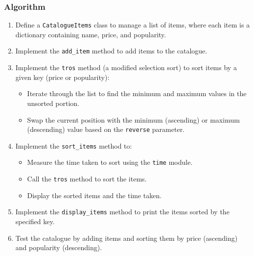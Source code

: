 \documentclass[a4paper,12pt]{article}
\begin{document}
\subsubsection*{Algorithm}
\begin{enumerate}
    \item Define a \texttt{CatalogueItems} class to manage a list of items, where each item is a dictionary containing name, price, and popularity.
    \item Implement the \texttt{add\_item} method to add items to the catalogue.
    \item Implement the \texttt{tros} method (a modified selection sort) to sort items by a given key (price or popularity):
    \begin{itemize}
        \item Iterate through the list to find the minimum and maximum values in the unsorted portion.
        \item Swap the current position with the minimum (ascending) or maximum (descending) value based on the \texttt{reverse} parameter.
    \end{itemize}
    \item Implement the \texttt{sort\_items} method to:
    \begin{itemize}
        \item Measure the time taken to sort using the \texttt{time} module.
        \item Call the \texttt{tros} method to sort the items.
        \item Display the sorted items and the time taken.
    \end{itemize}
    \item Implement the \texttt{display\_items} method to print the items sorted by the specified key.
    \item Test the catalogue by adding items and sorting them by price (ascending) and popularity (descending).
\end{enumerate}
\end{document}
